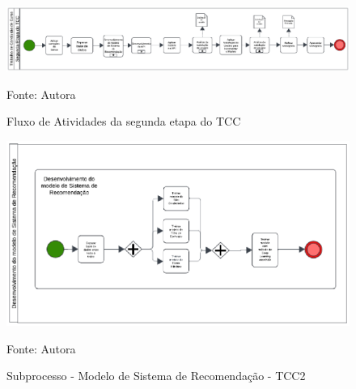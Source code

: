 \begin{figure}[htbp]
    \centering
    \caption{Fluxo de Atividades da segunda etapa do TCC}
    \label{fig:bpmnTcc2}
    
    \vspace{2pt} %
    
    \includegraphics[width=1.0\textwidth]{figuras/bpmnTcc2.eps}
    
    \vspace{2pt} %
    
    \small Fonte: Autora
\end{figure}

\begin{figure}[htbp]
    \centering
    \caption{Subprocesso - Modelo de Sistema de Recomendação - TCC2}
    \label{fig:subproccessrec}
    
    \vspace{2pt} %
    
    \includegraphics[width=1.0\textwidth]{figuras/subproccessrec.eps}
    
    \vspace{2pt} %
    
    \small Fonte: Autora
\end{figure}


